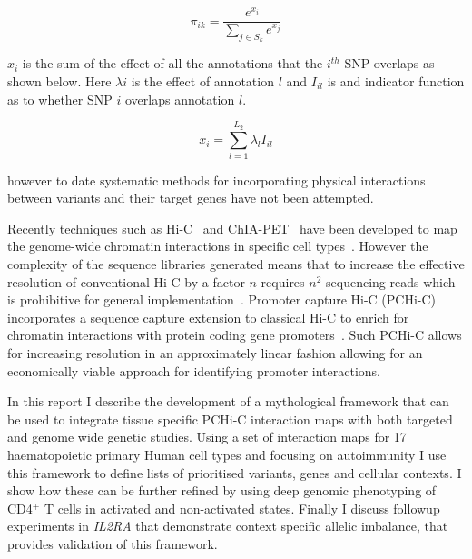 \documentclass[a4paper,11pt]{report}
\begin{document}
\begin{equation}
	\pi_{ik} = \frac{e^{x_{i}}}{\sum_{j \in S_k}e^{x_{j}}}
\end{equation}

$x_i$ is the sum of the effect of all the annotations that the $i^{th}$ SNP overlaps as shown below.  Here $\lambda{i}$ is the effect of annotation $l$ and $I_{il}$ is and indicator function as to whether SNP $i$ overlaps annotation $l$.  

\begin{equation}
	x_{i} = \sum_{l=1}^{L_{2}} \lambda_{l}I_{il}
\end{equation}


 however to date systematic methods for incorporating physical interactions between variants and their target genes have not been attempted.  




Recently techniques such as Hi-C~\citep{Lieberman-AidenvanBerkumWilliamsEtAl2009} and ChIA-PET~\citep{FullwoodLiuPanEtAl2009} have been developed to map the genome-wide chromatin interactions in specific cell types~\citep{RaoHuntleyDurandEtAl2014}. However the complexity of the sequence libraries generated means that to increase the effective resolution of conventional Hi-C by a factor $n$ requires $n^{2}$ sequencing reads which is prohibitive for general implementation~\citep{JaegerMiglioriniHenrionEtAl2015}. Promoter capture Hi-C (PCHi-C) incorporates a sequence capture extension to classical Hi-C to enrich for chromatin interactions with protein coding gene promoters~\citep{Mifsud2015-fm}. Such PCHi-C allows for increasing resolution in an approximately linear fashion allowing for an economically viable approach for identifying promoter interactions. 

In this report I describe the development of a mythological framework that can be used to integrate tissue specific PCHi-C interaction maps with both targeted and genome wide genetic studies. Using a set of interaction maps for 17 haematopoietic primary Human cell types and focusing on autoimmunity I use this framework to define lists of prioritised variants, genes and cellular contexts. I show how these can be further refined by using  deep genomic phenotyping of  CD4$^{+}$ T cells  in activated and non-activated states. Finally I discuss followup experiments in \textit{IL2RA} that demonstrate context specific allelic imbalance, that provides validation of this framework.
\end{document}
